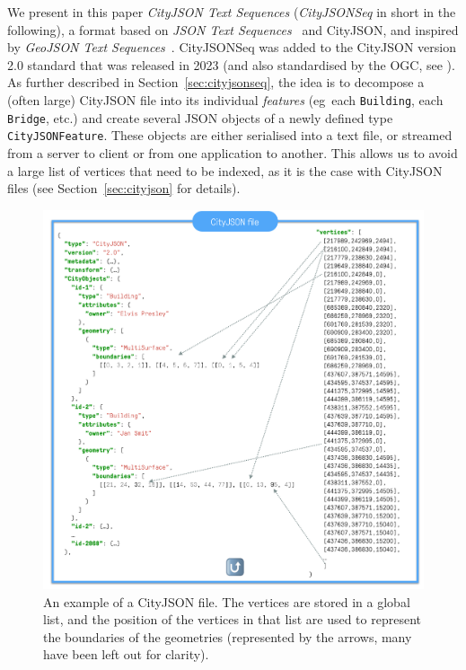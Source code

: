\documentclass{isprs} %
\newcommand{\eg}{eg}
\begin{document}
%

We present in this paper \emph{CityJSON Text Sequences} (\emph{CityJSONSeq} in short in the following), a format based on \emph{JSON Text Sequences}~\citep{IETF-JSONSeq} and CityJSON, and inspired by \emph{GeoJSON Text Sequences}~\citep{IETF-GeoJSONSeq}. 
CityJSONSeq was added to the CityJSON version 2.0 standard that was released in 2023 (and also standardised by the OGC, see \citet{OGC-CityJSON-v20}).
As further described in Section~\ref{sec:cityjsonseq}, the idea is to decompose a (often large) CityJSON file into its individual \emph{features} (\eg\ each \texttt{Building}, each \texttt{Bridge}, etc.) and create several JSON objects of a newly defined type \texttt{CityJSONFeature}.
These objects are either serialised into a text file, or streamed from a server to client or from one application to another.
This allows us to avoid a large list of vertices that need to be indexed, as it is the case with CityJSON files (see Section~\ref{sec:cityjson} for details).
\begin{figure}
  \centering
  \includegraphics[width=\linewidth]{figs/cj_idea}
  \caption{An example of a CityJSON file. The vertices are stored in a global list, and the position of the vertices in that list are used to represent the boundaries of the geometries (represented by the arrows, many have been left out for clarity).}%
\label{fig:cj_idea}
\end{figure}
\end{document}
